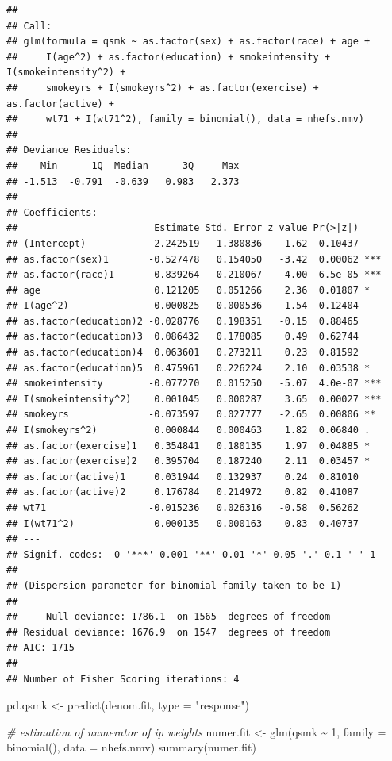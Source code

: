 \documentclass[
  10pt,
]{book}
\newenvironment{Shaded}{\begin{snugshade}}{\end{snugshade}}
\newcommand{\AttributeTok}[1]{\textcolor[rgb]{0.77,0.63,0.00}{#1}}
\newcommand{\CommentTok}[1]{\textcolor[rgb]{0.56,0.35,0.01}{\textit{#1}}}
\newcommand{\DecValTok}[1]{\textcolor[rgb]{0.00,0.00,0.81}{#1}}
\newcommand{\FunctionTok}[1]{\textcolor[rgb]{0.00,0.00,0.00}{#1}}
\newcommand{\NormalTok}[1]{#1}
\newcommand{\OtherTok}[1]{\textcolor[rgb]{0.56,0.35,0.01}{#1}}
\newcommand{\SpecialCharTok}[1]{\textcolor[rgb]{0.00,0.00,0.00}{#1}}
\newcommand{\StringTok}[1]{\textcolor[rgb]{0.31,0.60,0.02}{#1}}
\begin{document}
\begin{verbatim}
## 
## Call:
## glm(formula = qsmk ~ as.factor(sex) + as.factor(race) + age + 
##     I(age^2) + as.factor(education) + smokeintensity + I(smokeintensity^2) + 
##     smokeyrs + I(smokeyrs^2) + as.factor(exercise) + as.factor(active) + 
##     wt71 + I(wt71^2), family = binomial(), data = nhefs.nmv)
## 
## Deviance Residuals: 
##    Min      1Q  Median      3Q     Max  
## -1.513  -0.791  -0.639   0.983   2.373  
## 
## Coefficients:
##                        Estimate Std. Error z value Pr(>|z|)    
## (Intercept)           -2.242519   1.380836   -1.62  0.10437    
## as.factor(sex)1       -0.527478   0.154050   -3.42  0.00062 ***
## as.factor(race)1      -0.839264   0.210067   -4.00  6.5e-05 ***
## age                    0.121205   0.051266    2.36  0.01807 *  
## I(age^2)              -0.000825   0.000536   -1.54  0.12404    
## as.factor(education)2 -0.028776   0.198351   -0.15  0.88465    
## as.factor(education)3  0.086432   0.178085    0.49  0.62744    
## as.factor(education)4  0.063601   0.273211    0.23  0.81592    
## as.factor(education)5  0.475961   0.226224    2.10  0.03538 *  
## smokeintensity        -0.077270   0.015250   -5.07  4.0e-07 ***
## I(smokeintensity^2)    0.001045   0.000287    3.65  0.00027 ***
## smokeyrs              -0.073597   0.027777   -2.65  0.00806 ** 
## I(smokeyrs^2)          0.000844   0.000463    1.82  0.06840 .  
## as.factor(exercise)1   0.354841   0.180135    1.97  0.04885 *  
## as.factor(exercise)2   0.395704   0.187240    2.11  0.03457 *  
## as.factor(active)1     0.031944   0.132937    0.24  0.81010    
## as.factor(active)2     0.176784   0.214972    0.82  0.41087    
## wt71                  -0.015236   0.026316   -0.58  0.56262    
## I(wt71^2)              0.000135   0.000163    0.83  0.40737    
## ---
## Signif. codes:  0 '***' 0.001 '**' 0.01 '*' 0.05 '.' 0.1 ' ' 1
## 
## (Dispersion parameter for binomial family taken to be 1)
## 
##     Null deviance: 1786.1  on 1565  degrees of freedom
## Residual deviance: 1676.9  on 1547  degrees of freedom
## AIC: 1715
## 
## Number of Fisher Scoring iterations: 4
\end{verbatim}

\begin{Shaded}
\begin{Highlighting}[]
\NormalTok{pd.qsmk }\OtherTok{\textless{}{-}} \FunctionTok{predict}\NormalTok{(denom.fit, }\AttributeTok{type =} \StringTok{"response"}\NormalTok{)}

\CommentTok{\# estimation of numerator of ip weights}
\NormalTok{numer.fit }\OtherTok{\textless{}{-}} \FunctionTok{glm}\NormalTok{(qsmk }\SpecialCharTok{\textasciitilde{}} \DecValTok{1}\NormalTok{, }\AttributeTok{family =} \FunctionTok{binomial}\NormalTok{(), }\AttributeTok{data =}\NormalTok{ nhefs.nmv)}
\FunctionTok{summary}\NormalTok{(numer.fit)}
\end{Highlighting}
\end{Shaded}
\end{document}
